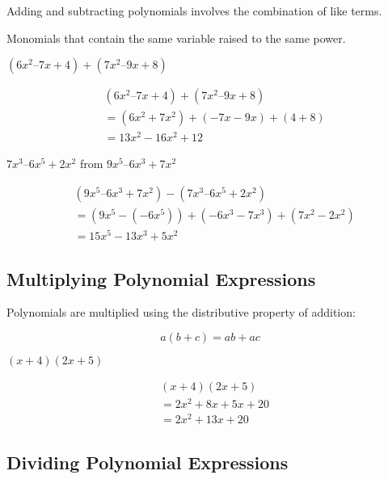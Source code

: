 \documentclass[english,seminar]{lecture}
\begin{document}
Adding and subtracting polynomials involves the combination of like terms.

\begin{definition}
	Monomials that contain the same variable raised to the same power.
\end{definition}

\begin{example}[Simplify]
	$(6x^2 – 7x + 4) + (7x^2 – 9x + 8)$


	\begin{align*}
		  &(6x^2 – 7x + 4) + (7x^2 – 9x + 8)      \\
		  &= (6x^2 + 7x^2) + (-7x - 9x) + (4 + 8) \\
		  &= 13x^2 - 16x^2 + 12
	\end{align*}
\end{example}

\begin{example}[Subtract]
	$7x^3 – 6x^5 + 2x^2$ from $9x^5 – 6x^3 + 7x^2$


	\begin{align*}
		  &(9x^5 – 6x^3 + 7x^2) - (7x^3 – 6x^5 + 2x^2)         \\
		  &= (9x^5 - (-6x^5)) + (-6x^3 - 7x^3) + (7x^2 - 2x^2) \\ 
		  &= 15x^5 - 13x^3 + 5x^2
	\end{align*}
\end{example}

\subsection{Multiplying Polynomial Expressions}

Polynomials are multiplied using the distributive property of addition:

$$
a(b + c) = ab + ac
$$

\begin{example}[Simplify]
	$(x + 4)(2x + 5)$


	\begin{align*}
		  &(x + 4)(2x + 5)      \\
		  &= 2x^2 + 8x + 5x + 20 \\
		  &= 2x^2 + 13x + 20
	\end{align*}
\end{example}

\subsection{Dividing Polynomial Expressions}
\end{document}
